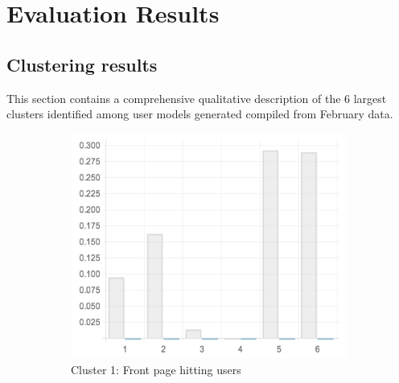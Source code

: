 \chapter{Evaluation Results}

\label{AppendixA}



\section{Clustering results}
\label{appendix:clustering_results}

This section contains a comprehensive qualitative description of the 6 largest clusters identified among user models generated compiled from February data.

\begin{figure}
  \centering
  \begin{subfigure}[t]{0.45\textwidth}
    \includegraphics[width=\textwidth]{Figures/clusterings/confluence-post/cluster1-chart}
    \caption{Cluster 1: Front page hitting users}
    \label{fig:cluster1-chart}
  \end{subfigure}
  \hfill
  \begin{subfigure}[t]{0.45\textwidth}

\end{subfigure}
\end{figure}
